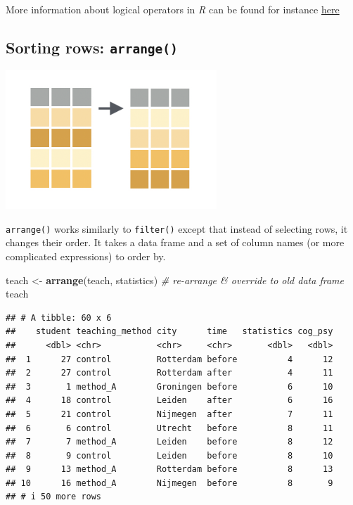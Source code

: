 \documentclass[
]{scrartcl}
\newenvironment{Shaded}{\begin{snugshade}}{\end{snugshade}}
\newcommand{\CommentTok}[1]{\textcolor[rgb]{0.56,0.35,0.01}{\textit{#1}}}
\newcommand{\KeywordTok}[1]{\textcolor[rgb]{0.13,0.29,0.53}{\textbf{#1}}}
\newcommand{\NormalTok}[1]{#1}
\newcommand{\StringTok}[1]{\textcolor[rgb]{0.31,0.60,0.02}{#1}}
\begin{document}
More information about logical operators in \emph{R} can be found for instance \href{https://r4ds.had.co.nz/transform.html\#logical-operators}{here}

\hypertarget{sorting-rows-arrange}{%
\subsection{\texorpdfstring{Sorting rows: \texttt{arrange()}}{Sorting rows: arrange()}}\label{sorting-rows-arrange}}

\begin{center}\includegraphics[width=300px]{images/dplyr-arrange} \end{center}

\texttt{arrange()} works similarly to \texttt{filter()} except that instead of selecting rows, it changes their order. It takes a data frame and a set of column names (or more complicated expressions) to order by.

\begin{Shaded}
\begin{Highlighting}[]
\NormalTok{teach \textless{}{-}}\StringTok{ }\KeywordTok{arrange}\NormalTok{(teach, statistics)   }\CommentTok{\# re{-}arrange \& override to old data frame}
\NormalTok{teach}
\end{Highlighting}
\end{Shaded}

\begin{verbatim}
## # A tibble: 60 x 6
##    student teaching_method city      time   statistics cog_psy
##      <dbl> <chr>           <chr>     <chr>       <dbl>   <dbl>
##  1      27 control         Rotterdam before          4      12
##  2      27 control         Rotterdam after           4      11
##  3       1 method_A        Groningen before          6      10
##  4      18 control         Leiden    after           6      16
##  5      21 control         Nijmegen  after           7      11
##  6       6 control         Utrecht   before          8      11
##  7       7 method_A        Leiden    before          8      12
##  8       9 control         Leiden    before          8      10
##  9      13 method_A        Rotterdam before          8      13
## 10      16 method_A        Nijmegen  before          8       9
## # i 50 more rows
\end{verbatim}
\end{document}
